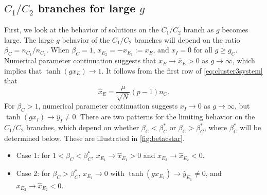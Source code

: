 \documentclass[reqno]{siamonline190516}
\begin{document}
\subsection{\texorpdfstring{$C_1/C_2$}{C1/C2} branches for large \texorpdfstring{$g$}{g}}

First, we look at the behavior of solutions on the $C_1/C_2$ branch as $g$ becomes large. The large $g$ behavior of the $C_1/C_2$ branches will depend on the ratio $\beta_C = n_{C_1}/n_{C_2}$. When $\beta_C = 1$, $x_{E_2} = -x_{E_1} := x_E$, and $x_I = 0$ for all $g \geq g_C$. Numerical parameter continuation suggests that $x_{E} \rightarrow \hat{x}_{E} > 0$ as $g \rightarrow \infty$, which implies that $\tanh(g x_{E}) \rightarrow 1$. It follows from the first row of \cref{eq:cluster3system} that 
\begin{equation}\label{eq:xEhat}
\hat{x}_{E} = \frac{\mu}{\sqrt{N}}(p-1)n_C.
\end{equation}
For $\beta_C > 1$, numerical parameter continuation suggests $x_I \rightarrow 0$ as $g \rightarrow \infty$, but $\tanh(g x_I) \rightarrow \hat{y}_I \neq 0$. There are two patterns for the limiting behavior on the $C_1/C_2$ branches, which depend on whether $\beta_C < \beta_C^*$ or $\beta_C > \beta_C^*$, where $\beta_C^*$ will be determined below. These are illustrated in \cref{fig:betacstar}.\\
\begin{itemize}
    \item Case 1: for $1 < \beta_C < \beta_C^*$, $x_{E_1} \rightarrow \hat{x}_{E_1} > 0$ and $x_{E_2} \rightarrow \hat{x}_{E_2} < 0$. 
    \item Case 2: for $\beta_C > \beta_C^*$, $x_{E_1} \rightarrow 0$ with $\tanh(g x_{E_1}) \rightarrow \hat{y}_{E_1} \neq 0$, and $x_{E_2} \rightarrow \hat{x}_{E_2} < 0$.\\
\end{itemize}
\end{document}
